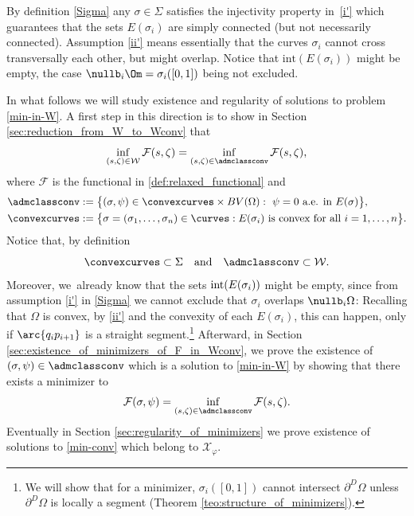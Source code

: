\begin{remark} By definition \eqref{Sigma} any $\sigma\in \Sigma$ satisfies the injectivity property in~\ref{i'} which guarantees that the sets $E(\sigma_i)$
are simply connected (but not necessarily connected).
Assumption \ref{ii'} means essentially that
the curves $\sigma_i$
cannot cross
transversally each other, but might overlap. Notice that $\mathrm{int}(E(\sigma_i))$ might be empty,
the case $\nullb_i\Om=\sigma_i([0,1])$ being not excluded.
\end{remark}
In what follows we will study existence and regularity of solutions
to problem \eqref{min-in-W}. A first step
in this direction is to show in Section \ref{sec:reduction_from_W_to_Wconv}
that
\begin{equation}\label{equivalence-W-Wconv}
\inf_{(s,\zeta)\in \mathcal W}\mathcal F(s,\zeta)=
\inf_{(s,\zeta)\in \admclassconv}\mathcal F(s,\zeta),
\end{equation}
where $\mathcal{F}$ is the functional in \eqref{def:relaxed_functional} and
\begin{equation}\label{def:admissible_class}
\begin{split}
\admclassconv&:=\big\{(\sigma,\psi)\in \convexcurves\times BV(\Omega):
\ \psi=0\text{ a.e. in }E(\sigma)\big\},\\
\convexcurves&:=\big\{\sigma = (\sigma_1,\dots,\sigma_n)
\in \curves: E(\sigma_i) \text{ is convex for all } i=1,\dots,n\big\}.
\end{split}
\end{equation}
{ Notice that, by definition
\begin{equation}\label{eq:W_subset_hatW}
\convexcurves\subset\Sigma\quad\text{and}\quad \admclassconv\subset\mathcal W.
\end{equation}
}
Moreover, we~already know that the sets $\textup{int}(E(\sigma_i))$
might be empty, since from assumption \ref{i'} in \eqref{Sigma} we cannot exclude that $\sigma_i$
overlaps $\nullb_i\Omega$: Recalling that $\Omega$ is convex,
by \ref{ii'} and the convexity of
each $E(\sigma_i)$, this can happen, only if $\arc{q_ip_{i+1}}$
is a straight segment.\footnote{We will show
that for a minimizer, $\sigma_i([0,1])$ cannot intersect
$\partial^D \Omega$ unless $\partial^D \Omega$
is locally a segment (Theorem \ref{teo:structure_of_minimizers}).}
Afterward, in Section \ref{sec:existence_of_minimizers_of_F_in_Wconv},
we prove the existence of $(\sigma,\psi)\in
\admclassconv$ which is a solution to \eqref{min-in-W} by showing that there exists a minimizer to
\begin{equation}\label{min-conv}
\mathcal F(\sigma,\psi)=
\inf_{(s,\zeta)\in \admclassconv}\mathcal F(s,\zeta).
\end{equation}
Eventually in Section \ref{sec:regularity_of_minimizers}
we prove existence of solutions to \eqref{min-conv} which belong to $\mathcal X_\varphi$.

